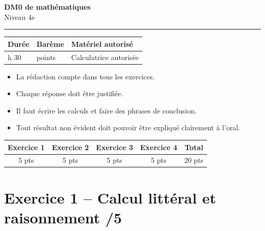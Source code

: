 \documentclass[11pt,a4paper]{article}
\begin{document}
\begin{center}
    {\LARGE \textbf{DM0 de mathématiques}}\\[0.4em]
    {\large Niveau 4e}\\[0.8em]
    \rule{0.9\textwidth}{0.8pt}
\end{center}

\begin{tabularx}{\textwidth}{|>{\centering\arraybackslash}p{}|>{\centering\arraybackslash}p{}|>{\centering\arraybackslash}X|}
\hline
\textbf{Durée} & \textbf{Barème} & \textbf{Matériel autorisé} \\
\hline
1 h 30 & 20 points & Calculatrice autorisée \\
\hline
\end{tabularx}

\vspace{1em}

\begin{tcolorbox}[title=Consignes générales]
\begin{itemize}[leftmargin=1.2cm]
    \item La rédaction compte dans tous les exercices.
    \item Chaque réponse doit être justifiée.
    \item Il faut écrire les calculs et faire des phrases de conclusion.
    \item Tout résultat non évident doit pouvoir être expliqué clairement à l'oral.
\end{itemize}
\end{tcolorbox}

\vspace{1em}

\begin{center}
\renewcommand{\arraystretch}{1.4}
\begin{tabular}{|c|c|c|c|c|}
\hline
\textbf{Exercice 1} & \textbf{Exercice 2} & \textbf{Exercice 3} & \textbf{Exercice 4} & \textbf{Total} \\
\hline
5 pts & 5 pts & 5 pts & 5 pts & 20 pts \\
\hline
\end{tabular}
\end{center}

\vspace{1em}

\section*{Exercice 1 -- Calcul littéral et raisonnement \hfill /5}
\end{document}
